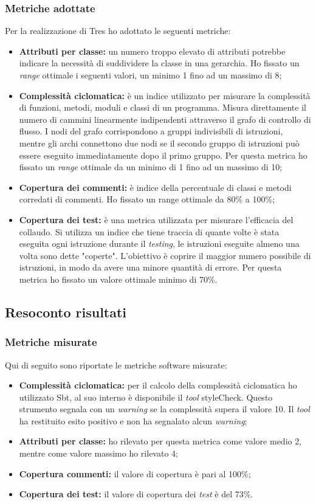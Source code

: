 \subsubsection{Metriche adottate}
Per la realizzazione di Tres ho adottato le seguenti metriche:
\begin{itemize}
\item \textbf{Attributi per classe:}  un numero troppo elevato di attributi potrebbe indicare la necessità di suddividere la classe in una gerarchia. Ho fissato un \emph{range} ottimale i seguenti valori, un minimo 1 fino ad un massimo di 8;
\item \textbf{Complessità ciclomatica:} è un indice utilizzato per misurare la complessità di funzioni, metodi, moduli e classi di un programma. Misura direttamente il numero di cammini linearmente indipendenti attraverso il grafo di controllo di flusso. I nodi del grafo corrispondono a gruppi indivisibili di istruzioni, mentre gli archi connettono due nodi se il secondo gruppo di istruzioni può essere eseguito immediatamente dopo il primo gruppo. Per questa metrica ho fissato un \textit{range} ottimale da un minimo di 1 fino ad un massimo di 10;
\item \textbf{Copertura dei commenti:} è indice della percentuale di classi e metodi corredati di commenti. Ho fissato un range ottimale da 80\% a 100\%;
\item \textbf{Copertura dei test:} è una metrica utilizzata per misurare l'efficacia del collaudo. Si utilizza un indice che tiene traccia di quante volte è stata eseguita ogni istruzione durante il \emph{testing}, le istruzioni eseguite almeno una volta sono dette "coperte". L'obiettivo è coprire il maggior numero possibile di istruzioni, in modo da avere una minore quantità di errore. Per questa metrica ho fissato un valore ottimale minimo di 70\%.
\end{itemize}
\subsection{Resoconto risultati}
\subsubsection{Metriche misurate}
Qui di seguito sono riportate le metriche software misurate:
\begin{itemize}
\item \textbf{Complessità ciclomatica:} per il calcolo della complessità ciclomatica ho utilizzato Sbt, al suo interno è disponibile il \emph{tool} styleCheck. Questo strumento segnala con un \emph{warning} se la complessità supera il valore 10. Il \emph{tool} ha restituito esito positivo e non ha segnalato alcun \emph{warning};
\item \textbf{Attributi per classe:} ho rilevato per questa metrica come valore medio 2, mentre come valore massimo ho rilevato 4;
\item \textbf{Copertura commenti:} il valore di copertura è pari al 100\%;
\item \textbf{Copertura dei test:} il valore di copertura dei \emph{test} è del 73\%.
\end{itemize}
